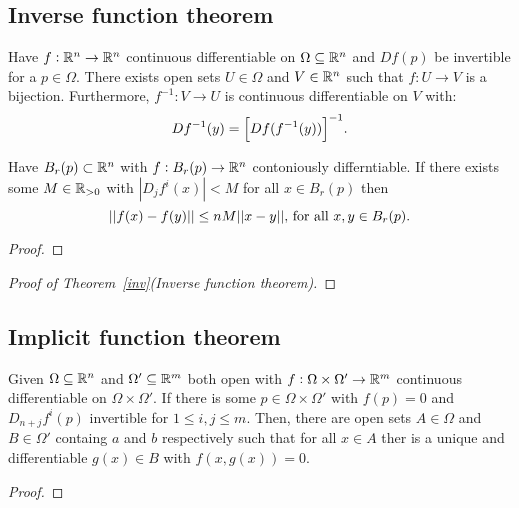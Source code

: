 \documentclass[../Year2.tex]{subfiles}
\begin{document}
\subsection{Inverse function theorem}

\begin{theorem}\label{inv}
    Have $f:\mathbb{R}^n\rightarrow \mathbb{R}^n$ continuous differentiable on $\Omega\subseteq\mathbb{R}^n$ and $Df(p)$ be invertible for a $p\in\Omega$. There exists open sets $U\in\Omega$ and $V\in\mathbb{R}^n$ such that $f:U\rightarrow V$ is a bijection. Furthermore, $f^{-1}:V\rightarrow U$ is continuous differentiable on $V$ with: \[
        Df^{-1}(y)={\left[Df(f^{-1}(y))\right]}^{-1}\text{\textcolor{black}{.}}
    \]
    \vspace{-20pt}
\end{theorem}

\begin{lemma}
    Have $B_r(p)\subset\mathbb{R}^n$ with $f:B_r(p)\rightarrow\mathbb{R}^n$ contoniously differntiable. If there exists some $M\in\mathbb{R}_{>0}$ with $|D_j f^i(x)|< M$ for all $x\in B_r(p)$ then \[
        ||f(x)-f(y)||\leq nM||x-y||\text{\textcolor{black}{, for all }} x,y\in B_r(p)\text{\textcolor{black}{.}}
    \]
    \begin{proof}
        
    \end{proof}
\end{lemma}

\begin{lemma}
    
\end{lemma}

\begin{lemma}
    
\end{lemma}

\begin{lemma}
    
\end{lemma}

\begin{proof}[Proof of Theorem~\ref{inv}(Inverse function theorem)]
    
\end{proof}

\subsection{Implicit function theorem}

\begin{theorem}
    Given $\Omega\subseteq\mathbb{R}^n$ and $\Omega'\subseteq\mathbb{R}^m$ both open with $f:\Omega\times\Omega'\rightarrow\mathbb{R}^m$ continuous differentiable on $\Omega\times\Omega'$. If there is some $p\in\Omega\times\Omega'$ with $f(p)=0$ and $D_{n+j}f^i(p)$ invertible for $1\leq i, j\leq m$. Then, there are open sets $A\in\Omega$ and $B\in\Omega'$ containg $a$ and $b$ respectively such that for all $x\in A$ ther is a unique and differentiable $g(x)\in B$ with $f(x,g(x))=0$.
    \begin{proof}
        
    \end{proof}
\end{theorem}
\end{document}
